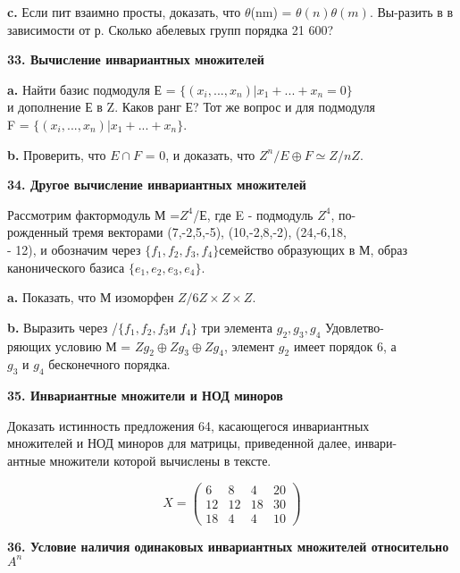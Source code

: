 \documentclass{../template/mai_book}
\begin{document}
{\bf c.} Если пит взаимно просты, доказать, что $\theta$(nm) = $\theta(n)\theta(m)$. 
Вы-\linebreak разить в в зависимости от р. Сколько абелевых групп порядка 21 600? 


{\noindent\bf33. Вычисление инвариантных множителей}


{\bf a.} Найти базис подмодуля Е = $\{(x_i,..., x_n) | x_1 + ... + x_n = 0\}$\\ 
и дополнение Е в Z. Каков ранг Е? Тот же вопрос и для подмодуля \\
F =  $\{(x_i,..., x_n) | x_1 + ... + x_n \}$.


{\bf b.} Проверить, что $E \cap F$ = {0}, и доказать, что $Z^n/E\oplus F\simeq Z/nZ$. 


{\noindent\bf34. Другое вычисление инвариантных множителей} 


Рассмотрим фактормодуль М =$Z^4$/Е, где E - подмодуль $Z^4$, 
по-\\рожденный тремя векторами (7,-2,5,-5), (10,-2,8,-2), (24,-6,18, \\
- 12), и обозначим через $\{f_1,f_2,f_3,f_4\}$семейство образующих в М, 
образ канонического базиса $\{e_1,e_2,e_3,e_4\}$. 


{\bf a.} Показать, что М изоморфен $Z/6Z \times Z \times Z$. 


{\bf b.} Выразить через /$\{f_1,f_2,f_3$\;и\; $f_4\}$ три элемента $g_2,g_3,g_4$
Удовлетво-\\ряющих условию М = $Zg_2\oplus Zg_3\oplus Zg_4$, элемент $g_2$ имеет порядок 6, а\\ 
$g_3$ и $g_4$ бесконечного порядка.

\pagebreak

{\noindent\bf35. Инвариантные множители и НОД миноров}

\medskip

Доказать истинность предложения 64, касающегося инвариантных\\ 
множителей и НОД миноров для матрицы, приведенной далее, 
инвари-\\антные множители которой вычислены в тексте. 



$$X =\begin{pmatrix}
6 & 8 & 4 & 20\\
12 & 12 & 18 & 30\\
18 & 4 & 4 & 10 
\end{pmatrix}$$



{\noindent\bf36. Условие наличия одинаковых инвариантных множителей 
относительно $A^n$} 
\end{document}
